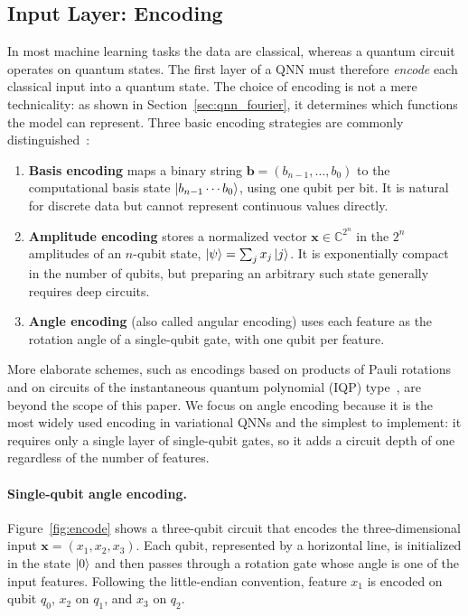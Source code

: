 \documentclass[12pt]{article}
\numberwithin{equation}{section}  %
\begin{document}
\subsection{Input Layer: Encoding}
\label{sec:encoding}

In most machine learning tasks the data are classical, whereas a quantum circuit operates on quantum states. The first layer of a QNN must therefore \emph{encode} each classical input into a quantum state. The choice of encoding is not a mere technicality: as shown in Section~\ref{sec:qnn_fourier}, it determines which functions the model can represent. Three basic encoding strategies are commonly distinguished~\cite{benedetti2019parameterized, schuld2021machine}:
\begin{enumerate}
\item \textbf{Basis encoding} maps a binary string $\mathbf{b} = (b_{n-1}, \ldots, b_0)$ to the computational basis state $\ket{b_{n-1} \cdots b_0}$, using one qubit per bit. It is natural for discrete data but cannot represent continuous values directly.
\item \textbf{Amplitude encoding} stores a normalized vector $\mathbf{x} \in \mathbb{C}^{2^n}$ in the $2^n$ amplitudes of an $n$-qubit state, $\ket{\psi} = \sum_j x_j \ket{j}$. It is exponentially compact in the number of qubits, but preparing an arbitrary such state generally requires deep circuits.
\item \textbf{Angle encoding} (also called angular encoding) uses each feature as the rotation angle of a single-qubit gate, with one qubit per feature.
\end{enumerate}
More elaborate schemes, such as encodings based on products of Pauli rotations and on circuits of the instantaneous quantum polynomial (IQP) type~\cite{havlicek2019supervised}, are beyond the scope of this paper. We focus on angle encoding because it is the most widely used encoding in variational QNNs and the simplest to implement: it requires only a single layer of single-qubit gates, so it adds a circuit depth of one regardless of the number of features.

\paragraph{Single-qubit angle encoding.} Figure~\ref{fig:encode} shows a three-qubit circuit that encodes the three-dimensional input $\mathbf{x} = (x_1, x_2, x_3)$. Each qubit, represented by a horizontal line, is initialized in the state $\ket{0}$ and then passes through a rotation gate whose angle is one of the input features. Following the little-endian convention, feature $x_1$ is encoded on qubit $q_0$, $x_2$ on $q_1$, and $x_3$ on $q_2$.
\end{document}
